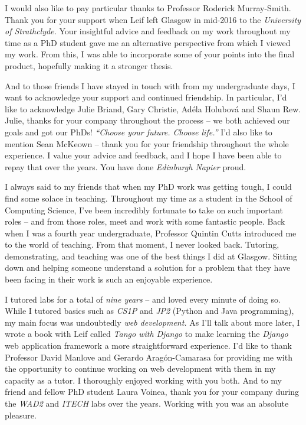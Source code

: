 \begin{preamble}
I would also like to pay particular thanks to Professor Roderick Murray-Smith. Thank you for your support when Leif left Glasgow in mid-2016 to the \emph{University of Strathclyde.} Your insightful advice and feedback on my work throughout my time as a PhD student gave me an alternative perspective from which I viewed my work. From this, I was able to incorporate some of your points into the final product, hopefully making it a stronger thesis.

And to those friends I have stayed in touch with from my undergraduate days, I want to acknowledge your support and continued friendship. In particular, I'd like to acknowledge Julie Briand, Gary Christie, Ad\'{e}la Holubov\'{a} and Shaun Rew. Julie, thanks for your company throughout the process -- we both achieved our goals and got our PhDs! \emph{``Choose your future. Choose life.''} I'd also like to mention Sean McKeown -- thank you for your friendship throughout the whole experience. I value your advice and feedback, and I hope I have been able to repay that over the years. You have done \emph{Edinburgh Napier} proud.

I always said to my friends that when my PhD work was getting tough, I could find some solace in teaching. Throughout my time as a student in the School of Computing Science, I've been incredibly fortunate to take on such important roles -- and from those roles, meet and work with some fantastic people. Back when I was a fourth year undergraduate, Professor Quintin Cutts introduced me to the world of teaching. From that moment, I never looked back. Tutoring, demonstrating, and teaching was one of the best things I did at Glasgow. Sitting down and helping someone understand a solution for a problem that they have been facing in their work is such an enjoyable experience.

I tutored labs for a total of \emph{nine years} -- and loved every minute of doing so. While I tutored basics such as \emph{CS1P} and \emph{JP2} (Python and Java programming), my main focus was undoubtedly \emph{web development.} As I'll talk about more later, I wrote a book with Leif called \emph{Tango with Django} to make learning the \emph{Django} web application framework a more straightforward experience. I'd like to thank Professor David Manlove and Gerardo Arag\'{o}n-Camarasa for providing me with the opportunity to continue working on web development with them in my capacity as a tutor. I thoroughly enjoyed working with you both. And to my friend and fellow PhD student Laura Voinea, thank you for your company during the \emph{WAD2} and \emph{ITECH} labs over the years. Working with you was an absolute pleasure.


\end{preamble}
